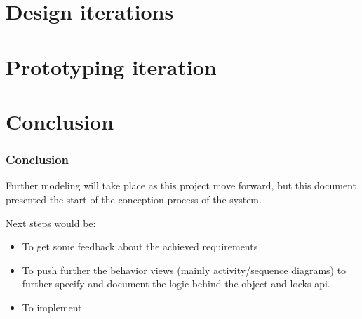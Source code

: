 \documentclass[a4paper,11pt]{article}
\author{%
    Léo-Nils Boissier \\
    \url{github.com/leonils}
}
\begin{document}


\tableofcontents
\newpage


% 
% 
% 
% 
% 
% 

% 
% 
% 
% 
% 
% 
% 

\newpage
\part{Design iterations}










\newpage
\part{Prototyping iteration}





\newpage
\part{Conclusion}
\section{Conclusion}
Further modeling will take place as this project move forward, but this document presented the start of the conception process of the system.

Next steps would be:

\begin{itemize}
    \item To get some feedback about the achieved requirements
    \item To push further the behavior views (mainly activity/sequence diagrams) to further specify and document the logic behind the object and locks api.
    \item To implement
\end{itemize}
\end{document}
